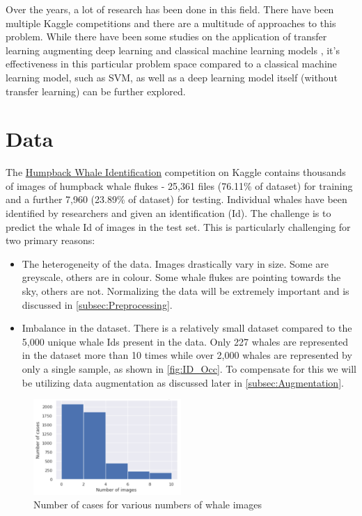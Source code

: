 \documentclass[paper=a4, fontsize=11pt]{scrartcl}
\numberwithin{equation}{section}		%
\numberwithin{table}{section}				%
\begin{document}
Over the years, a lot of research has been done in this field. There have been multiple Kaggle competitions and there are a multitude of approaches to this problem. While there have been some studies on the application of transfer learning augmenting deep learning and classical machine learning models \cite{YuanHongchun2020AAIC}, it's effectiveness in this particular problem space compared to a classical machine learning model, such as SVM, as well as a deep learning model itself (without transfer learning) can be further explored.

\section{Data}\label{sec: data}

The \href{https://www.kaggle.com/competitions/humpback-whale-identification/overview}{Humpback Whale Identification} competition \cite{WhateIdentifcationChallengeKaggle} on Kaggle contains thousands of images of humpback whale flukes - 25,361 files (76.11\% of dataset) for training and a further 7,960 (23.89\% of dataset) for testing. Individual whales have been identified by researchers and given an identification (Id). The challenge is to predict the whale Id of images in the test set. This is particularly challenging for two primary reasons:
\begin{itemize}
  \item The heterogeneity of the data. Images drastically vary in size. Some are greyscale, others are in colour. Some whale flukes are pointing towards the sky, others are not. Normalizing the data will be extremely important and is discussed in \autoref{subsec:Preprocessing}.
  \item Imbalance in the dataset. There is a relatively small dataset compared to the 5,000 unique whale Ids present in the data. Only 227 whales are represented in the dataset more than 10 times while over 2,000 whales are represented by only a single sample, as shown in \autoref{fig:ID_Occ}. To compensate for this we will be utilizing data augmentation as discussed later in \autoref{subsec:Augmentation}.
\end{itemize}

\begin{figure}[H]
    \centering
    \includegraphics[width=0.5\textwidth]{ID_Occurences.png}
    \caption{Number of cases for various numbers of whale images}
    \label{fig:ID_Occ}
\end{figure}
\end{document}
